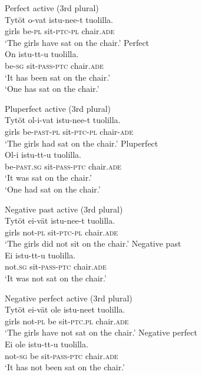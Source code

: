 \documentclass[output=paper]{langsci/langscibook}
\begin{document}
\ea\label{ex:nikanne:paradigm4}
\ea Perfect  active (3rd  plural)\\
\gll  Tytöt o-vat istu-nee-t tuolilla. \\
girls be-\textsc{pl} sit-\textsc{ptc}-\textsc{pl} chair.\textsc{ade}\\
\glt ‘The girls have sat on the chair.’
\ex Perfect  \\
\gll  On istu-tt-u tuolilla. \\
be-\textsc{sg} sit-\textsc{pass}-\textsc{ptc} chair.\textsc{ade}\\
\glt  `It has been sat on the chair.’\\ ‘One has sat on the chair.'\\
\z
\z

\ea\label{ex:nikanne:paradigm5}
\ea Pluperfect  active (3rd  plural)\\
\gll  Tytöt ol-i-vat istu-nee-t tuolilla. \\
girls be-\textsc{past}-\textsc{pl} sit-\textsc{ptc}-\textsc{pl} chair-\textsc{ade}\\
\glt  ‘The girls had sat on the chair.’
\ex Pluperfect  \\
\gll  Ol-i istu-tt-u tuolilla. \\
 be-\textsc{past}.\textsc{sg} sit-\textsc{pass}-\textsc{ptc} chair.\textsc{ade}\\
\glt ‘It was sat on the chair.’\\
 ‘One had sat on the chair.’\\
\z
\z

\ea\label{ex:nikanne:paradigm6}
\ea Negative past active (3rd  plural)\\
\gll  Tytöt ei-vät istu-nee-t tuolilla. \\
     girls not-\textsc{pl} sit-\textsc{ptc}-\textsc{pl} chair.\textsc{ade}\\
 \glt ‘The girls did not sit on the chair.'
\ex Negative past \\
\gll  Ei istu-tt-u tuolilla. \\
not.\textsc{sg} sit-\textsc{pass}-\textsc{ptc} chair.\textsc{ade}\\
\glt ‘It was not sat on the chair.’\\
\z
\z

\ea\label{ex:nikanne:paradigm7}
\ea Negative perfect  active (3rd  plural)\\
\gll  Tytöt ei-vät ole istu-neet tuolilla. \\
    girls not-\textsc{pl} be sit-\textsc{ptc}.\textsc{pl} chair.\textsc{ade}\\
\glt  ‘The girls have not sat on the chair.’
\ex Negative perfect  \\
\gll  Ei ole istu-tt-u tuolilla. \\
 not-\textsc{sg} be sit-\textsc{pass}-\textsc{ptc} chair.\textsc{ade}\\
\glt ‘It has not been sat on the chair.’\\
\z
\z
\end{document}
